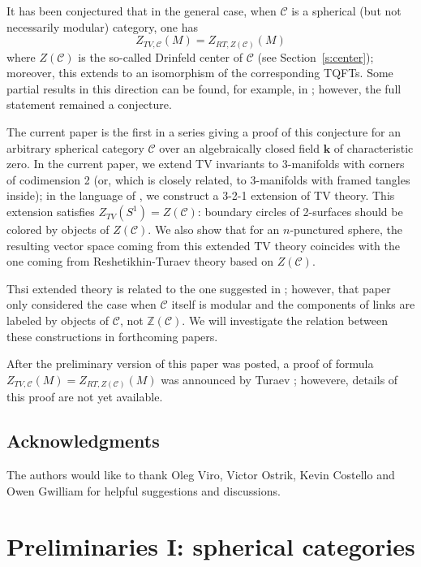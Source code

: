 \documentclass{amsart}
\theoremstyle{definition}
\theoremstyle{remark}
\numberwithin{equation}{section}
\newcommand{\seref}[1]{Section~{\rm\ref{#1}}}
\newcommand{\<}{\langle}
\renewcommand{\>}{\rangle}
\newcommand{\kk}{\mathbf{k}}       %
\newcommand{\Z}{\mathbb{Z}}       %
\newcommand{\C}{\mathcal{C}}      %
\begin{document}
It has been conjectured that in the general case, when $\C$ is a spherical
(but not necessarily modular) category, one has
$$
Z_{TV, \C}(M)=Z_{RT, Z(\C)}(M)
$$
where $Z(\C)$ is the so-called Drinfeld center of $\C$ (see
\seref{s:center}); moreover, this extends to an isomorphism of the
corresponding TQFTs. Some partial results in this direction can be found,
for example, in ; however, the full statement remained a
conjecture.

The current paper is the first in a series giving a proof of this
conjecture for an arbitrary spherical category $\C$ over an algebraically
closed field $\kk$ of characteristic zero. In the current paper, we extend
TV invariants to 3-manifolds with corners of codimension 2 (or, which is
closely related, to 3-manifolds with framed tangles inside); in the
language of , we construct a 3-2-1  extension of TV theory.
This extension satisfies $Z_{TV}(S^1)=Z(\C)$: boundary circles of
2-surfaces
should be colored by objects of $Z(\C)$. We also show that for an
$n$-punctured sphere, the
resulting vector space coming from this extended TV theory coincides with
the one coming from Reshetikhin-Turaev theory based on $Z(\C)$.

Thsi extended theory is related to the one
suggested in ; however, that paper only considered the case
when $\C$ itself is modular and the components of links are labeled by
objects of $\C$, not $\Z(\C)$. We will investigate the relation between
these constructions in forthcoming papers. 

After the preliminary version of this paper was posted, a proof of formula
$Z_{TV, \C}(M)=Z_{RT, Z(\C)}(M)$ was announced by Turaev
; howevere, details of this proof are not yet
available. 


\subsection*{Acknowledgments}
The authors would like  to thank
Oleg Viro, Victor Ostrik, Kevin Costello and Owen Gwilliam
for helpful suggestions and discussions.





\section{Preliminaries I: spherical categories}\label{s:prelim}
\end{document}
